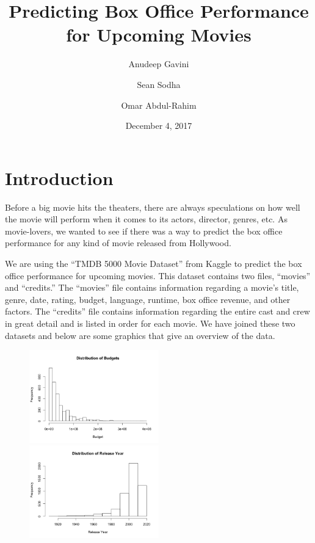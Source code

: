 \documentclass{article}
\title{Predicting Box Office Performance for Upcoming Movies}
\author{Anudeep Gavini \and Sean Sodha \and Omar Abdul-Rahim}
\date{December 4, 2017}
\begin{document}
\maketitle

\section*{Introduction}
\vspace{0.2in}

Before a big movie hits the theaters, there are always speculations on how well the movie will perform when it comes to its actors, director, genres, etc. As movie-lovers, we wanted to see if there was a way to predict the box office performance for any kind of movie released from Hollywood. 

We are using the “TMDB 5000 Movie Dataset” from Kaggle to predict the box office performance for upcoming movies. This dataset contains two files, “movies” and “credits.” The “movies” file contains information regarding a movie’s title, genre, date, rating, budget, language, runtime, box office revenue, and other factors. The “credits” file contains information regarding the entire cast and crew in great detail and is listed in order for each movie. We have joined these two datasets and below are some graphics that give an overview of the data. 

\begin{figure}[ht]
\includegraphics[width = 0.5\textwidth]{budget.png}
\includegraphics[width = 0.5\textwidth]{release.png}
\end{figure}
\end{document}
